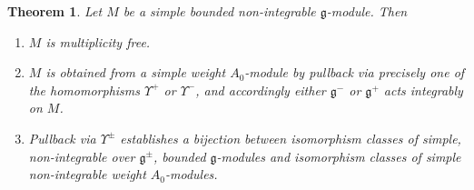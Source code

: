 \documentclass[12pt]{amsart}
\theoremstyle{plain} %
\numberwithin{equation}{section}
\theoremstyle{definition}
\theoremstyle{remark}
\theoremstyle{plain} %
\newtheorem{theorem}[definition]{Theorem}
\renewcommand{\gg}{\mathfrak{g}}
\def\gg{\mathfrak{g}}
\begin{document}
          \begin{theorem}\label{thm:sl-simple} Let $M$ be a simple bounded non-integrable $\gg$-module. Then
              \begin{enumerate}
              \item[(a)] $M$ is multiplicity free.
              \item[(b)] $M$ is obtained from a simple weight $A_0$-module by pullback via precisely one of the homomorphisms
                $\Upsilon^+$ or $\Upsilon^-$, and accordingly either $\gg^-$ or $\gg^+$ acts integrably on $M$.
              \item[(c)] Pullback via $\Upsilon^\pm$  establishes a bijection between isomorphism classes of simple, non-integrable over
                $\gg^\pm$, bounded
                $\gg$-modules and isomorphism classes of simple non-integrable weight $A_0$-modules.
                \end{enumerate}
          
              \end{theorem}
\end{document}
